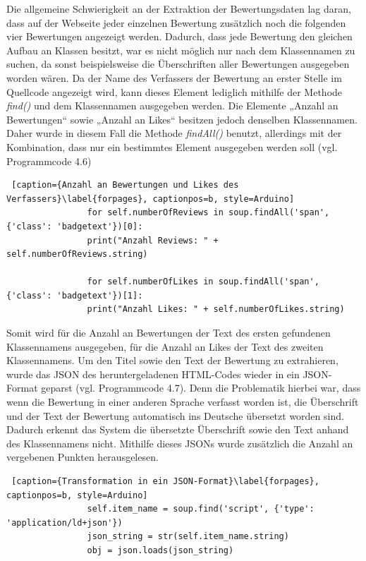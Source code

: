 \documentclass[a4paper,oneside,12pt]{report}
\begin{document}
				Die allgemeine Schwierigkeit an der Extraktion der Bewertungsdaten lag daran, dass auf der Webseite jeder einzelnen Bewertung zusätzlich noch die folgenden vier Bewertungen angezeigt werden. Dadurch, dass jede Bewertung den gleichen Aufbau an Klassen besitzt, war es nicht möglich nur nach dem Klassennamen zu suchen, da sonst beispielsweise die Überschriften aller Bewertungen ausgegeben worden wären. 
				Da der Name des Verfassers der Bewertung an erster Stelle im Quellcode angezeigt wird, kann dieses Element lediglich mithilfe der Methode 	\textit{find()} und dem Klassennamen ausgegeben werden. 
				Die Elemente „Anzahl an Bewertungen“ sowie „Anzahl an Likes“ besitzen jedoch denselben Klassennamen. Daher wurde in diesem Fall die Methode \textit{findAll()} benutzt, allerdings mit der Kombination, dass nur ein bestimmtes Element ausgegeben werden soll (vgl. Programmcode 4.6)
				\newpage
				\begin{lstlisting} [caption={Anzahl an Bewertungen und Likes des Verfassers}\label{forpages}, captionpos=b, style=Arduino]
				for self.numberOfReviews in soup.findAll('span', {'class': 'badgetext'})[0]:
				print("Anzahl Reviews: " + self.numberOfReviews.string)
				
				for self.numberOfLikes in soup.findAll('span', {'class': 'badgetext'})[1]:
				print("Anzahl Likes: " + self.numberOfLikes.string)
				\end{lstlisting}
				
				Somit wird für die Anzahl an Bewertungen der Text des ersten gefundenen Klassennamens ausgegeben, für die Anzahl an Likes der Text des zweiten Klassennamens. 
				Um den Titel sowie den Text der Bewertung zu extrahieren, wurde das JSON des heruntergeladenen HTML-Codes wieder in ein JSON-Format geparst (vgl. Programmcode 4.7). Denn die Problematik hierbei war, dass wenn die Bewertung in einer anderen Sprache verfasst worden ist, die Überschrift und der Text der Bewertung automatisch ins Deutsche übersetzt worden sind. Dadurch erkennt das System die übersetzte Überschrift sowie den Text anhand des Klassennamens nicht. Mithilfe dieses JSONs wurde zusätzlich die Anzahl an vergebenen Punkten herausgelesen.  
				\\
				\begin{lstlisting} [caption={Transformation in ein JSON-Format}\label{forpages}, captionpos=b, style=Arduino]
				self.item_name = soup.find('script', {'type': 'application/ld+json'})
				json_string = str(self.item_name.string)
				obj = json.loads(json_string)
				\end{lstlisting}
				
\end{document}
